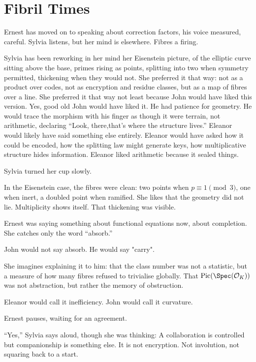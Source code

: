 \section*{Fibril Times}

Ernest has moved on to speaking about correction factors,
his voice measured, careful.
Sylvia listens, but her mind is elsewhere. Fibres a firing.

Sylvia has been reworking in her mind her Eisenstein picture, of  the elliptic curve sitting above the base, primes rising as points, splitting into two when symmetry permitted, thickening when they would not. She preferred it that way: not as a product over codes, not as encryption and residue classes, but as a map of fibres over a line. She preferred it that way not least because John would have liked this version. Yes, good old  John would have liked it. He had patience for geometry. He would trace the morphism with his finger as though it were terrain, not arithmetic, declaring “Look, there,that’s where the structure lives.” Eleanor would likely have said something else entirely. Eleanor would have asked how it could be encoded, how the splitting law might generate keys, how multiplicative structure hides information. Eleanor liked arithmetic because it sealed things.

Sylvia turned her cup slowly.

In the Eisenstein case, the fibres were clean: two points when $p\equiv1\pmod{3}$,
one when inert, a doubled point when ramified. She likes that the geometry did not lie.
Multiplicity shows itself. That thickening was visible.

Ernest was saying something about functional equations now,
about completion. She catches only the word “absorb.”

John would not say absorb. He would say "carry".

She imagines explaining it to him: that the class number was not a statistic,
but a measure of how many fibres refused to trivialise globally.
That $\Pic(\Spec(\mathcal{O}_K))$ was not abstraction, but rather the memory of obstruction.

Eleanor would call it inefficiency.
John would call it curvature.

Ernest pauses, waiting for an agreement.

“Yes,” Sylvia says aloud, though she was thinking:
A collaboration is controlled but companionship is something else.
It is not encryption. Not involution, not squaring back to a start.

